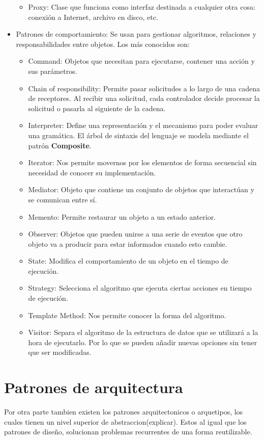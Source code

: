 \documentclass[12pt]{report} %
\begin{document}
\begin{itemize}
\begin{itemize}
 		\item Proxy: Clase que funciona como interfaz destinada a cualquier otra cosa: conexión a Internet, archivo en disco, etc.
 	\end{itemize}
 	\item Patrones de comportamiento: Se usan para gestionar algoritmos, relaciones y responsabilidades entre objetos. Los más conocidos son: 
 	\begin{itemize}
 		\item Command: Objetos que necesitan para ejecutarse, contener una acción y sus parámetros. 
 		\item Chain of responsibility: Permite pasar solicitudes a lo largo de una cadena de receptores. Al recibir una solicitud, cada controlador decide procesar la solicitud o pasarla al siguiente de la cadena.
 		\item Interpreter: Define una representación y el mecanismo para poder evaluar una gramática. El árbol de sintaxis del lenguaje se modela mediante el patrón \textbf{Composite}.
 		\item Iterator: Nos permite movernos por los elementos de forma secuencial sin necesidad de conocer su implementación.
 		\item Mediator: Objeto que contiene un conjunto de objetos que interactúan y se comunican entre sí.
 		\item Memento: Permite restaurar un objeto a un estado anterior.
 		\item Observer: Objetos que pueden unirse a una serie de eventos que otro objeto va a producir para estar informados cuando esto cambie.
 		\item State: Modifica el comportamiento de un objeto en el tiempo de ejecución.
 		\item Strategy: Selecciona el algoritmo que ejecuta ciertas acciones en tiempo de ejecución.
 		\item Template Method: Nos permite conocer la forma del algoritmo.
 		\item Visitor: Separa el algoritmo de la estructura de datos que se utilizará a la hora de ejecutarlo. Por lo que se pueden añadir nuevas opciones sin tener que ser modificadas.
 	\end{itemize}
	 \end{itemize}
 \section{Patrones de arquitectura}
 Por otra parte tambien existen los patrones arquitectonicos o arquetipos, los cuales tienen un nivel superior de abstraccion(explicar). Estos al igual que los patrones de diseño, solucionan problemas recurrentes de una forma reutilizable.
 
\end{document}
